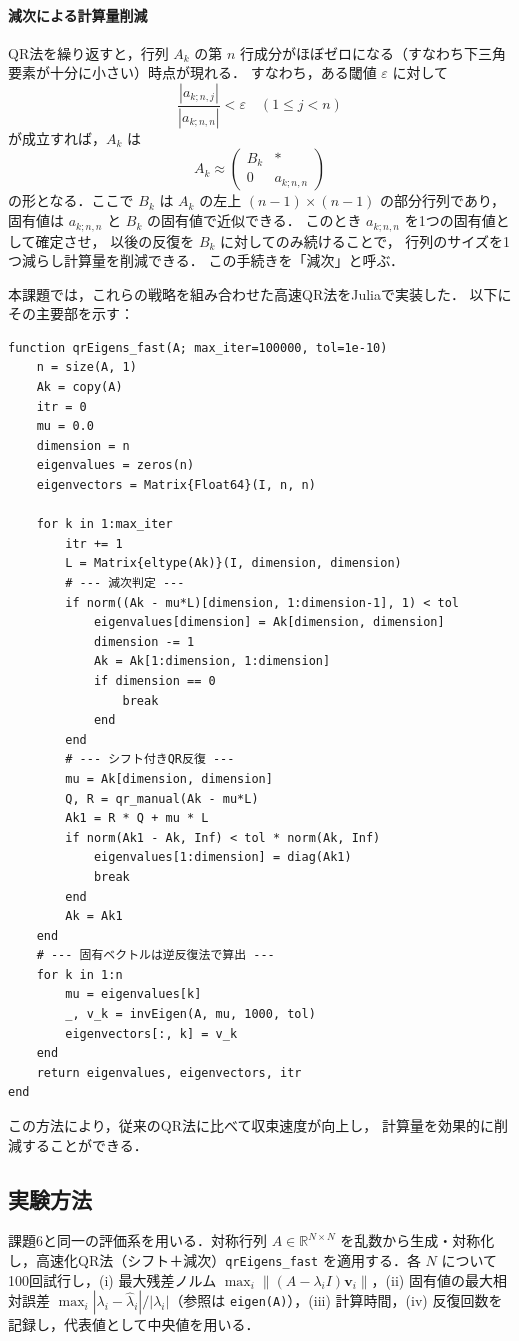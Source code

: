 \documentclass[a4paper,11pt]{ltjsarticle}
\begin{document}
\paragraph{減次による計算量削減}
QR法を繰り返すと，行列 $A_k$ の第 $n$ 行成分がほぼゼロになる（すなわち下三角要素が十分に小さい）時点が現れる．
すなわち，ある閾値 $\varepsilon$ に対して
\[
\frac{|a_{k;n,j}|}{|a_{k;n,n}|} < \varepsilon \quad (1 \le j < n)
\]
が成立すれば，$A_k$ は
\[
A_k \approx
\begin{pmatrix}
B_k & * \\
0 & a_{k;n,n}
\end{pmatrix}
\]
の形となる．ここで $B_k$ は $A_k$ の左上 $(n-1)\times(n-1)$ の部分行列であり，
固有値は $a_{k;n,n}$ と $B_k$ の固有値で近似できる．
このとき $a_{k;n,n}$ を1つの固有値として確定させ，
以後の反復を $B_k$ に対してのみ続けることで，
行列のサイズを1つ減らし計算量を削減できる．
この手続きを「減次」と呼ぶ．


本課題では，これらの戦略を組み合わせた高速QR法をJuliaで実装した．
以下にその主要部を示す：

\begin{verbatim}
function qrEigens_fast(A; max_iter=100000, tol=1e-10)
    n = size(A, 1)
    Ak = copy(A)
    itr = 0
    mu = 0.0
    dimension = n
    eigenvalues = zeros(n)
    eigenvectors = Matrix{Float64}(I, n, n)

    for k in 1:max_iter
        itr += 1
        L = Matrix{eltype(Ak)}(I, dimension, dimension)
        # --- 減次判定 ---
        if norm((Ak - mu*L)[dimension, 1:dimension-1], 1) < tol
            eigenvalues[dimension] = Ak[dimension, dimension]
            dimension -= 1
            Ak = Ak[1:dimension, 1:dimension]
            if dimension == 0
                break
            end
        end
        # --- シフト付きQR反復 ---
        mu = Ak[dimension, dimension]
        Q, R = qr_manual(Ak - mu*L)
        Ak1 = R * Q + mu * L
        if norm(Ak1 - Ak, Inf) < tol * norm(Ak, Inf)
            eigenvalues[1:dimension] = diag(Ak1)
            break
        end
        Ak = Ak1
    end
    # --- 固有ベクトルは逆反復法で算出 ---
    for k in 1:n
        mu = eigenvalues[k]
        _, v_k = invEigen(A, mu, 1000, tol)
        eigenvectors[:, k] = v_k
    end
    return eigenvalues, eigenvectors, itr
end
\end{verbatim}

この方法により，従来のQR法に比べて収束速度が向上し，
計算量を効果的に削減することができる．

\subsection{実験方法}
課題6と同一の評価系を用いる．対称行列 $A\in\mathbb{R}^{N\times N}$ を乱数から生成・対称化し，高速化QR法（シフト＋減次）\verb|qrEigens_fast| を適用する．各 $N$ について100回試行し，(i) 最大残差ノルム $\max_i\|(A-\lambda_i I)\boldsymbol{v}_i\|$，(ii) 固有値の最大相対誤差 $\max_i |\lambda_i-\hat\lambda_i|/|\lambda_i|$（参照は \verb|eigen(A)|），(iii) 計算時間，(iv) 反復回数を記録し，代表値として中央値を用いる．
\end{document}

